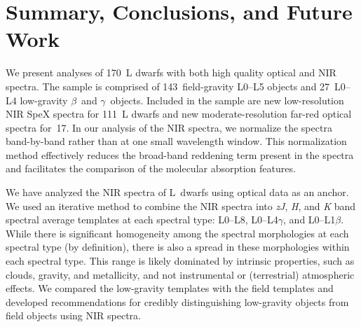 \documentclass[12pt]{aastex6}
\newcommand{\sample}{170}
\newcommand{\optField}{143}
\newcommand{\optLowG}{27}
\newcommand{\NewOptObjects}{17} %
\newcommand{\NewPrismObjects}{111} %
\begin{document}
\section{Summary, Conclusions, and Future Work}
\label{sec:summary}
We present analyses of \sample~L dwarfs with both high quality optical and NIR spectra.
The sample is comprised of \optField~field-gravity L0--L5 objects and \optLowG~L0--L4 low-gravity $\beta$~and $\gamma$~objects.
Included in the sample are new low-resolution NIR SpeX spectra for \NewPrismObjects~L dwarfs and new moderate-resolution far-red optical spectra for~\NewOptObjects.
In our analysis of the NIR spectra, we normalize the spectra band-by-band rather than at one small wavelength window.
This normalization method effectively reduces the broad-band reddening term present in the spectra and facilitates the comparison of the molecular absorption features.

We have analyzed the NIR spectra of L~dwarfs using optical data as an anchor.
We used an iterative method to combine the NIR spectra into \emph{zJ}, \emph{H}, and \emph{K} band spectral average templates at each spectral type: L0--L8, L0--L4$\gamma$, and L0--L1$\beta$.
While there is significant homogeneity among the spectral morphologies at each spectral type (by definition), there is also a spread in these morphologies within each spectral type.
This range is likely dominated by intrinsic properties, such as clouds, gravity, and metallicity, and not instrumental or (terrestrial) atmospheric effects.
We compared the low-gravity templates with the field templates and developed recommendations for credibly distinguishing low-gravity objects from field objects using NIR spectra.
\end{document}
